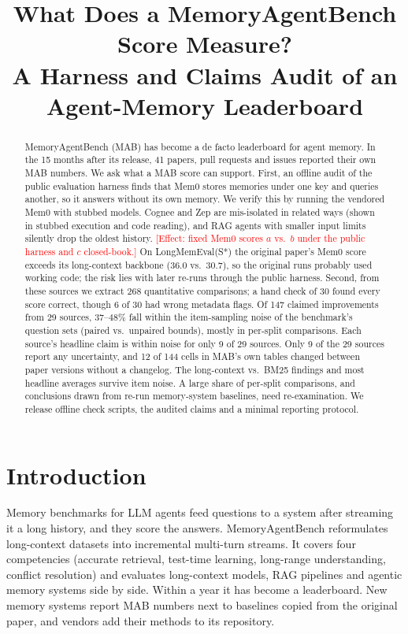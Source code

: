 \documentclass[11pt,a4paper]{article}
\title[What Does a MemoryAgentBench Score Measure?]{What Does a MemoryAgentBench Score Measure?\\A Harness and Claims Audit of an Agent-Memory Leaderboard}
\newcommand{\tbd}[1]{\textcolor{red}{[#1]}}
\begin{document}
\maketitle

\begin{abstract}
MemoryAgentBench (MAB) has become a de facto leaderboard for agent memory. In the 15 months after its release,
41 papers, pull requests and issues reported their own MAB numbers. We ask what a MAB score can support. First, an
offline audit of the public evaluation harness finds that Mem0 stores memories under one key and queries
another, so it answers without its own memory. We verify this by running the vendored Mem0 with stubbed models.
Cognee and Zep are mis-isolated in related ways (shown in stubbed execution and code reading), and RAG agents
with smaller input limits silently drop the oldest history. \tbd{Effect: fixed Mem0 scores $a$ vs.\ $b$ under the
public harness and $c$ closed-book.} On LongMemEval(S*) the original paper's Mem0 score exceeds its long-context backbone (36.0 vs.\ 30.7), so the
original runs probably used working code; the risk lies with later re-runs through the public harness. Second, from these sources we extract 268
quantitative comparisons; a hand check of 30 found every score correct, though 6 of 30 had wrong metadata flags.
Of 147 claimed improvements from 29 sources, 37--48\% fall within the item-sampling noise of the benchmark's
question sets (paired vs.\ unpaired bounds), mostly in per-split comparisons. Each source's headline claim is
within noise for only 9 of 29 sources. Only 9 of the 29 sources report any uncertainty, and 12 of 144 cells in
MAB's own tables changed between paper versions without a changelog. The long-context vs.\ BM25 findings and most headline averages survive item noise. A large share of per-split comparisons, and conclusions drawn from
re-run memory-system baselines, need re-examination. We release offline check scripts, the audited claims and a
minimal reporting protocol.
\end{abstract}

\section{Introduction}
\label{sec:intro}
Memory benchmarks for LLM agents feed questions to a system after streaming it a long history, and they score
the answers. MemoryAgentBench \citep{hu2026memoryagentbench} reformulates long-context datasets into incremental
multi-turn streams. It covers four competencies (accurate retrieval, test-time learning, long-range
understanding, conflict resolution) and evaluates long-context models, RAG pipelines and agentic memory systems
side by side. Within a year it has become a leaderboard. New memory systems report MAB numbers next to baselines
copied from the original paper, and vendors add their methods to its repository.
\end{document}
